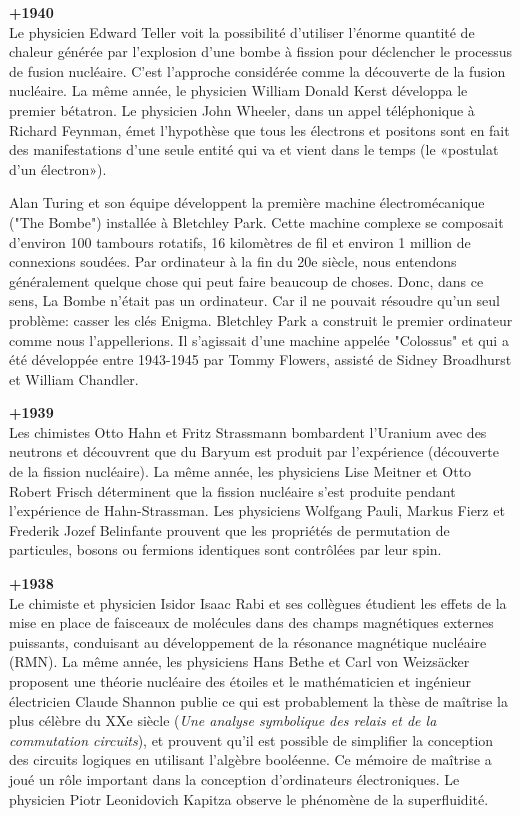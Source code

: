 \textbf{+1940}\\
Le physicien Edward Teller voit la possibilité d'utiliser l'énorme quantité de chaleur générée par l'explosion d'une bombe à fission pour déclencher le processus de fusion nucléaire. C'est l'approche considérée comme la découverte de la fusion nucléaire. La même année, le physicien William Donald Kerst développa le premier bétatron. Le physicien John Wheeler, dans un appel téléphonique à Richard Feynman, émet l'hypothèse que tous les électrons et positons sont en fait des manifestations d'une seule entité qui va et vient dans le temps (le «postulat d'un électron»).

Alan Turing et son équipe développent la première machine électromécanique ("The Bombe") installée à Bletchley Park. Cette machine complexe se composait d'environ 100 tambours rotatifs, 16 kilomètres de fil et environ 1 million de connexions soudées. Par ordinateur à la fin du 20e siècle, nous entendons généralement quelque chose qui peut faire beaucoup de choses. Donc, dans ce sens, La Bombe n'était pas un ordinateur. Car il ne pouvait résoudre qu'un seul problème: casser les clés Enigma. Bletchley Park a construit le premier ordinateur comme nous l'appellerions. Il s'agissait d'une machine appelée "Colossus" et qui a été développée entre 1943-1945 par Tommy Flowers, assisté de Sidney Broadhurst et William Chandler.

\textbf{+1939}\\
Les chimistes Otto Hahn et Fritz Strassmann bombardent l'Uranium avec des neutrons et découvrent que du Baryum est produit par l'expérience (découverte de la fission nucléaire). La même année, les physiciens Lise Meitner et Otto Robert Frisch déterminent que la fission nucléaire s'est produite pendant l'expérience de Hahn-Strassman. Les physiciens Wolfgang Pauli, Markus Fierz et Frederik Jozef Belinfante prouvent que les propriétés de permutation de particules, bosons ou fermions identiques sont contrôlées par leur spin.

\textbf{+1938}\\
Le chimiste et physicien Isidor Isaac Rabi et ses collègues étudient les effets de la mise en place de faisceaux de molécules dans des champs magnétiques externes puissants, conduisant au développement de la résonance magnétique nucléaire (RMN). La même année, les physiciens Hans Bethe et Carl von Weizsäcker proposent une théorie nucléaire des étoiles et le mathématicien et ingénieur électricien Claude Shannon publie ce qui est probablement la thèse de maîtrise la plus célèbre du XXe siècle (\textit{Une analyse symbolique des relais et de la commutation circuits}), et prouvent qu'il est possible de simplifier la conception des circuits logiques en utilisant l'algèbre booléenne. Ce mémoire de maîtrise a joué un rôle important dans la conception d'ordinateurs électroniques. Le physicien Piotr Leonidovich Kapitza observe le phénomène de la superfluidité.

